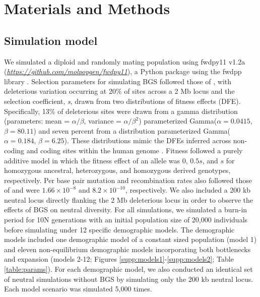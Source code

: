\documentclass[9pt,twocolumn,twoside]{rilabRxiv}
\begin{document}
\section{Materials and Methods}
\label{sec:materials:methods}

\subsection{Simulation model}

We simulated a diploid and randomly mating population using fwdpy11 v1.2a (\href{https://github.com/molpopgen/fwdpy11}{\emph{https://github.com/molpopgen/fwdpy11}}), a Python package using the fwdpp library \citep{thornton2014c++}.
Selection parameters for simulating BGS followed those of \citet{torres2018human}, with deleterious variation occurring at 20\% of sites across a 2 Mb locus and the selection coefficient, \textit{s}, drawn from two distributions of fitness effects (DFE).
Specifically, 13\% of deleterious sites were drawn from a gamma distribution (parameters: mean = $\alpha/\beta$, variance = $\alpha/\beta^2$) parameterized Gamma($\alpha = 0.0415$, $\beta = 80.11$) and seven percent from a distribution parameterized Gamma($\alpha = 0.184$, $\beta = 6.25$).
These distributions mimic the DFEs inferred across non-coding and coding sites within the human genome \citep{torgerson2009evolutionary, boyko2008assessing}.
Fitness followed a purely additive model in which the fitness effect of an allele was 0, $0.5s$, and $s$ for homozygous ancestral, heterozygous, and homozygous derived genotypes, respectively.
Per base pair mutation and recombination rates also followed those of \citet{torres2018human} and were $1.66 \times 10^{-8}$ and $8.2 \times 10^{-10}$, respectively.
We also included a 200 kb neutral locus directly flanking the 2 Mb deleterious locus in order to observe the effects of BGS on neutral diversity.
For all simulations, we simulated a burn-in period for 10N generations with an initial population size of 20,000 individuals before simulating under 12 specific demographic models.
The demographic models included one demographic model of a constant sized population (model 1) and eleven non-equilibrium demographic models incorporating both bottlenecks and expansion (models 2-12; Figures \ref{supp:models1}-\ref{supp:models2}; Table \ref{table:params}).
For each demographic model, we also conducted an identical set of neutral simulations without BGS by simulating only the 200 kb neutral locus.
Each model scenario was simulated 5,000 times.
\end{document}

